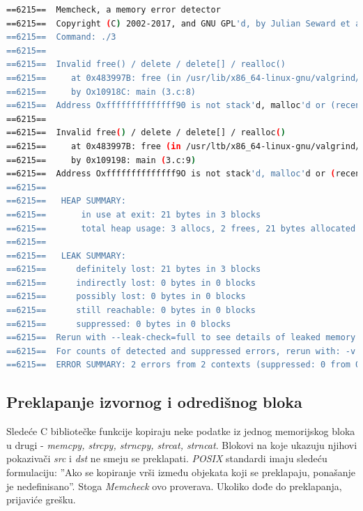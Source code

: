 \documentclass[12pt,oneside]{memoir}
\theoremstyle{plain}
\theoremstyle{definition}
\begin{document}
\begin{lstlisting}[style=terminal,caption={Primer ispisa greške nedopuštenog oslobađanja memorije}, label={lst:slika2.9},language={bash}] 
==6215==  Memcheck, a memory error detector
==6215==  Copyright (C) 2002-2017, and GNU GPL'd, by Julian Seward et al. Using Valgrind-3.14.0 and LibVEX; rerun with -h for copyright info 
==6215==  Command: ./3
==6215== 
==6215==  Invalid free() / delete / delete[] / realloc()
==6215==     at 0x483997B: free (in /usr/lib/x86_64-linux-gnu/valgrind/vgpreload_memcheck-amd64-linux.so) 
==6215==     by Ox10918C: main (3.c:8)
==6215==  Address Oxffffffffffffff90 is not stack'd, malloc'd or (recently) free'd
==6215== 
==6215==  Invalid free() / delete / delete[] / realloc()
==6215==     at 0x483997B: free (in /usr/ltb/x86_64-linux-gnu/valgrind/vgpreload_memcheck-amd64-linux.so) 
==6215==     by 0x109198: main (3.c:9)
==6215==  Address Oxffffffffffffff9O is not stack'd, malloc'd or (recently) free'd
==6215== 
==6215==   HEAP SUMMARY:
==6215==       in use at exit: 21 bytes in 3 blocks
==6215==       total heap usage: 3 allocs, 2 frees, 21 bytes allocated
==6215== 
==6215==   LEAK SUMMARY:
==6215==      definitely lost: 21 bytes in 3 blocks 
==6215==      indirectly lost: 0 bytes in 0 blocks
==6215==      possibly lost: 0 bytes in 0 blocks 
==6215==      still reachable: 0 bytes in 0 blocks
==6215==      suppressed: 0 bytes in 0 blocks
==6215==  Rerun with --leak-check=full to see details of leaked memory
==6215==  For counts of detected and suppressed errors, rerun with: -v 
==6215==  ERROR SUMMARY: 2 errors from 2 contexts (suppressed: 0 from 0)
\end{lstlisting}

\subsection{Preklapanje izvornog i odredišnog bloka}
Sledeće C bibliotečke funkcije kopiraju neke podatke iz jednog memorijskog bloka u drugi - \textit{memcpy, strcpy, strncpy, strcat, strncat}.  Blokovi na koje ukazuju njihovi pokazivači \textit{src} i \textit{dst} ne smeju se preklapati. \textit{POSIX} standardi imaju sledeću formulaciju: ''Ako se kopiranje vrši između objekata koji se preklapaju, ponašanje je nedefinisano''.  Stoga \textit{Memcheck} ovo proverava. Ukoliko dođe do preklapanja, prijaviće grešku.
\end{document}
